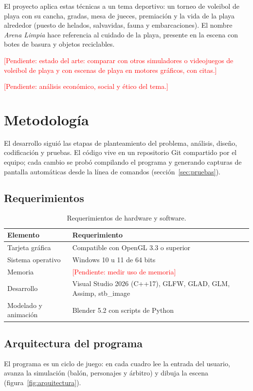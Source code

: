 \documentclass[12pt,letterpaper]{article}
\newcommand{\pendiente}[1]{\textcolor{red}{[Pendiente: #1]}}
\begin{document}
El proyecto aplica estas técnicas a un tema deportivo: un torneo de voleibol de playa con su
cancha, gradas, mesa de jueces, premiación y la vida de la playa alrededor (puesto de
helados, salvavidas, fauna y embarcaciones). El nombre \emph{Arena Limpia} hace referencia al
cuidado de la playa, presente en la escena con botes de basura y objetos reciclables.

\pendiente{estado del arte: comparar con otros simuladores o videojuegos de voleibol de playa
y con escenas de playa en motores gráficos, con citas.}

\pendiente{análisis económico, social y ético del tema.}

\section{Metodología}
El desarrollo siguió las etapas de planteamiento del problema, análisis, diseño, codificación
y pruebas. El código vive en un repositorio Git compartido por el equipo; cada cambio se
probó compilando el programa y generando capturas de pantalla automáticas desde la línea de
comandos (sección~\ref{sec:pruebas}).

\subsection{Requerimientos}
\begin{table}[H]
  \centering
  \caption{Requerimientos de hardware y software.}
  \label{tab:requerimientos}
  \begin{tabularx}{\linewidth}{l X}
    \toprule
    \textbf{Elemento} & \textbf{Requerimiento} \\
    \midrule
    Tarjeta gráfica & Compatible con OpenGL 3.3 o superior \\
    Sistema operativo & Windows 10 u 11 de 64 bits \\
    Memoria & \pendiente{medir uso de memoria} \\
    Desarrollo & Visual Studio 2026 (C++17), GLFW, GLAD, GLM, Assimp, stb\_image \\
    Modelado y animación & Blender 5.2 con scripts de Python \\
    \bottomrule
  \end{tabularx}
\end{table}

\subsection{Arquitectura del programa}
El programa es un ciclo de juego: en cada cuadro lee la entrada del usuario, avanza la
simulación (balón, personajes y árbitro) y dibuja la escena (figura~\ref{fig:arquitectura}).
\end{document}

